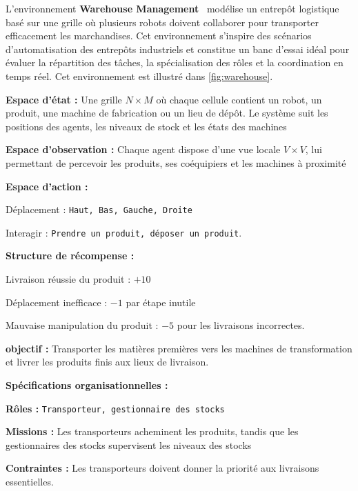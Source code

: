 L'environnement \textbf{Warehouse Management}~\cite{warehouse_management} modélise un entrepôt logistique basé sur une grille où plusieurs robots doivent collaborer pour transporter efficacement les marchandises. Cet environnement s'inspire des scénarios d'automatisation des entrepôts industriels et constitue un banc d'essai idéal pour évaluer la répartition des tâches, la spécialisation des rôles et la coordination en temps réel. Cet environnement est illustré dans \autoref{fig:warehouse}.
%
\begin{enumerate*}[label={\roman*)}, itemjoin={; \quad}]
    \item \textbf{Espace d'état :} Une grille $N \times M$ où chaque cellule contient un robot, un produit, une machine de fabrication ou un lieu de dépôt. Le système suit les positions des agents, les niveaux de stock et les états des machines
    \item \textbf{Espace d'observation :} Chaque agent dispose d'une vue locale $V \times V$, lui permettant de percevoir les produits, ses coéquipiers et les machines à proximité
    \item \textbf{Espace d'action :}
    \begin{enumerate*}[label={\roman*)}, itemjoin={; \quad}]
        \item Déplacement : \texttt{Haut, Bas, Gauche, Droite}
        \item Interagir : \texttt{Prendre un produit, déposer un produit}.
    \end{enumerate*}
    \item \textbf{Structure de récompense :}
    \begin{enumerate*}[label={\roman*)}, itemjoin={; \quad}]
        \item Livraison réussie du produit : $+10$
        \item Déplacement inefficace : $-1$ par étape inutile
        \item Mauvaise manipulation du produit : $-5$ pour les livraisons incorrectes.
    \end{enumerate*}
    \item \textbf{objectif :} Transporter les matières premières vers les machines de transformation et livrer les produits finis aux lieux de livraison.
\end{enumerate*}
%
\textbf{Spécifications organisationnelles :}
\begin{enumerate*}[label={\roman*)}, itemjoin={; \quad}]
    \item \textbf{Rôles :} \texttt{Transporteur, gestionnaire des stocks}
    \item \textbf{Missions :} Les transporteurs acheminent les produits, tandis que les gestionnaires des stocks supervisent les niveaux des stocks
    \item \textbf{Contraintes :} Les transporteurs doivent donner la priorité aux livraisons essentielles.
\end{enumerate*}

